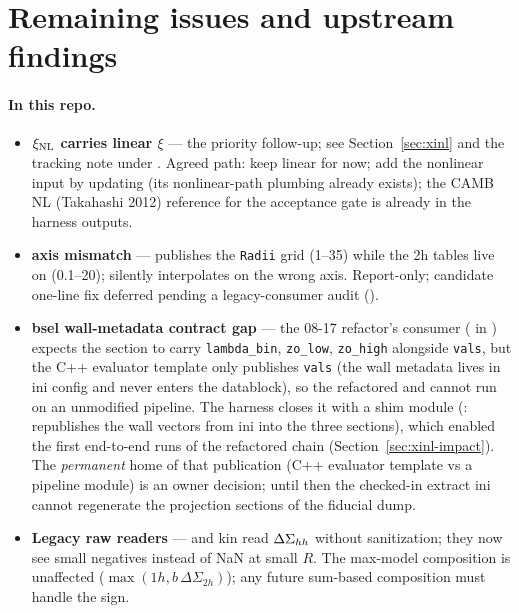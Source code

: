 \section{Remaining issues and upstream findings}
\label{sec:remaining}

\paragraph{In this repo.}
\begin{itemize}
\item \textbf{$\xi_{\rm NL}$ carries linear $\xi$} --- the priority follow-up;
  see Section~\ref{sec:xinl} and the tracking note under
  . Agreed path: keep linear for
  now; add the nonlinear input by updating  (its
  nonlinear-path plumbing already exists); the CAMB NL (Takahashi 2012) reference
  for the acceptance gate is already in the harness outputs.
\item \textbf{ axis mismatch} ---  publishes
  the \texttt{Radii} grid (1--35) while the 2h tables live on
   (0.1--20); 
  silently interpolates  on the wrong axis. Report-only;
  candidate one-line fix deferred pending a legacy-consumer audit
  ().
\item \textbf{bsel wall-metadata contract gap} --- the 08-17 refactor's
  consumer ( in
  ) expects the 
  section to carry \texttt{lambda\_bin}, \texttt{zo\_low},
  \texttt{zo\_high} alongside \texttt{vals}, but
  the C++ evaluator template only publishes \texttt{vals} (the wall
  metadata lives in ini config and never enters the datablock), so the
  refactored  and 
  cannot run on an unmodified pipeline. The harness closes it with a
  shim module (: republishes the
  wall vectors from ini into the three sections), which enabled the
  first end-to-end runs of the refactored chain
  (Section~\ref{sec:xinl-impact}). The \emph{permanent} home of that
  publication (C++ evaluator template vs a pipeline module) is an owner
  decision; until then the checked-in extract ini cannot regenerate the
  projection sections of the fiducial dump.
\item \textbf{Legacy raw readers} --- 
  and kin read $\Delta\Sigma_{hh}$ without sanitization; they now see small
  negatives instead of NaN at small $R$. The max-model composition is
  unaffected ($\max(1h, b\,\Delta\Sigma_{2h})$); any future sum-based
  composition must handle the sign.
\end{itemize}

